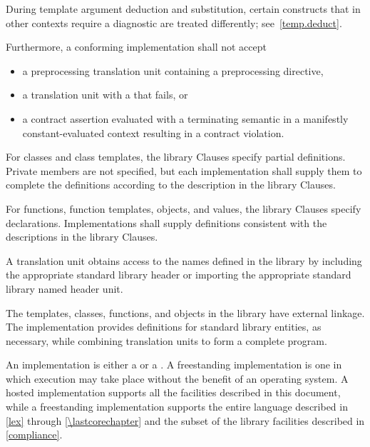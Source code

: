 \begin{note}
During template argument deduction and substitution,
certain constructs that in other contexts require a diagnostic
are treated differently;
see~\ref{temp.deduct}.
\end{note}
Furthermore, a conforming implementation
shall not accept
\begin{itemize}
\item
a preprocessing translation unit containing
a  preprocessing directive,
\item
a translation unit with
a  that fails, or
\item
a contract assertion evaluated with a terminating semantic
in a manifestly constant-evaluated context
resulting in a contract violation.
\end{itemize}

\pnum
{}%
%
%
For classes and class templates, the library Clauses specify partial
definitions. Private members are not
specified, but each implementation shall supply them to complete the
definitions according to the description in the library Clauses.

\pnum
For functions, function templates, objects, and values, the library
Clauses specify declarations. Implementations shall supply definitions
consistent with the descriptions in the library Clauses.

\pnum
A \Cpp{}  translation unit
obtains access to the names defined in the library by
including the appropriate standard library header or importing
the appropriate standard library named header unit.

\pnum
The templates, classes, functions, and objects in the library have
external linkage. The implementation provides
definitions for standard library entities, as necessary, while combining
translation units to form a complete \Cpp{}  program.%

\pnum
An implementation is either a
 or a
.
A freestanding
implementation is one in which execution may take place without the benefit of
an operating system.
A hosted implementation
supports all the facilities described in this document, while
a freestanding implementation
supports the entire \Cpp{} language
described in \ref{lex} through \ref{\lastcorechapter} and
the subset of the library facilities described in \ref{compliance}.

